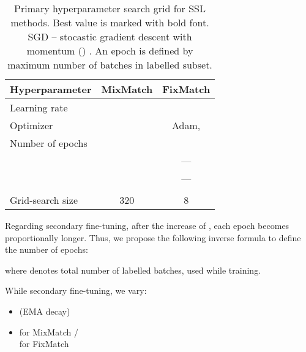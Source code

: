 \documentclass[runningheads]{llncs}
\begin{document}
\begin{table}
    \centering
    \setlength{\tabcolsep}{2.5pt}
    \renewcommand{\arraystretch}{1}
    \begin{tabular}{l|c|c}
        \toprule
         Hyperparameter &  MixMatch & FixMatch\\ \midrule
         Learning rate &  &  \\
         Optimizer &  & Adam,  \\
         Number of epochs &  &  \\
          &  & --- \\
          &  & --- \\
          &  &  \\ \midrule
         Grid-search size & 320 & 8 \\
         \bottomrule
    \end{tabular}
    \vspace{0.2cm}
    \caption{Primary hyperparameter search grid for SSL methods. Best value is marked with bold font. SGD -- stocastic gradient descent with momentum () \cite{nesterov1983method}. An epoch is defined by maximum number of batches in labelled subset.}
    \label{tab:grid_search}
\end{table}


Regarding secondary fine-tuning, after the increase of , each epoch becomes proportionally longer. Thus, we propose the following inverse formula to define the number of epochs:

where  denotes total number of labelled batches, used while training. 

While secondary fine-tuning, we vary:
\begin{itemize}
    \item  (EMA decay)
    \item  for MixMatch / \\  for FixMatch
\end{itemize} 
\end{document}
